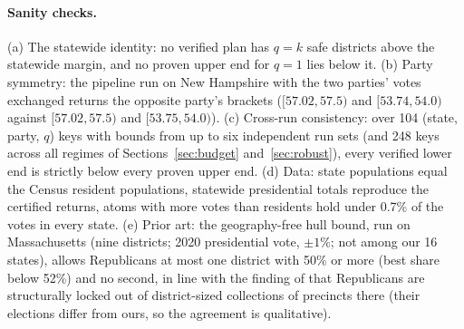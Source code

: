 \paragraph{Sanity checks.}
(a) The statewide identity: no verified plan has $q=k$ safe districts above the statewide margin, and no proven upper end for $q=1$ lies below it. (b) Party symmetry: the pipeline run on New Hampshire with the two parties' votes exchanged returns the opposite party's brackets ($[57.02,57.5)$ and $[53.74,54.0)$ against $[57.02,57.5)$ and $[53.75,54.0)$). (c) Cross-run consistency: over 104 (state, party, $q$) keys with bounds from up to six independent run sets (and 248 keys across all regimes of Sections~\ref{sec:budget} and~\ref{sec:robust}), every verified lower end is strictly below every proven upper end. (d) Data: state populations equal the Census resident populations, statewide presidential totals reproduce the certified returns, atoms with more votes than residents hold under 0.7\% of the votes in every state. (e) Prior art: the geography-free hull bound, run on Massachusetts (nine districts; 2020 presidential vote, $\pm1\%$; not among our 16 states), allows Republicans at most one district with 50\% or more (best share below 52\%) and no second, in line with the finding of \citet{duchin2019} that Republicans are structurally locked out of district-sized collections of precincts there (their elections differ from ours, so the agreement is qualitative).
